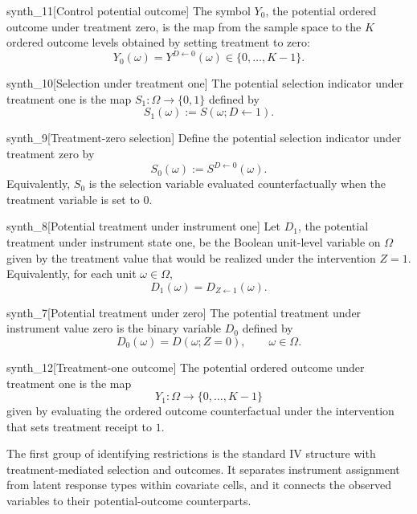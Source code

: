 \documentclass[11pt]{article}
\begin{document}
\begin{definitionv}{synth_11}[Control potential outcome]
The symbol \(Y_0\), the potential ordered outcome under treatment zero, is the map from the sample space to the \(K\) ordered outcome levels obtained by setting treatment to zero:
\[
Y_0(\omega)=Y^{D\leftarrow 0}(\omega)\in\{0,\ldots,K-1\}.
\]
\end{definitionv}

\begin{definitionv}{synth_10}[Selection under treatment one]
The potential selection indicator under treatment one is the map \(S_1:\Omega\to\{0,1\}\) defined by
\[
S_1(\omega) := S(\omega; D\leftarrow 1).
\]
\end{definitionv}

\begin{definitionv}{synth_9}[Treatment-zero selection]
Define the potential selection indicator under treatment zero by
\[
S_0(\omega) := S^{D \leftarrow 0}(\omega).
\]
Equivalently, \(S_0\) is the selection variable evaluated counterfactually when the treatment variable is set to \(0\).
\end{definitionv}

\begin{definitionv}{synth_8}[Potential treatment under instrument one]
Let \(D_1\), the potential treatment under instrument state one, be the Boolean unit-level variable on \(\Omega\) given by the treatment value that would be realized under the intervention \(Z=1\). Equivalently, for each unit \(\omega\in\Omega\),
\[
D_1(\omega)=D_{Z\leftarrow 1}(\omega).
\]
\end{definitionv}

\begin{definitionv}{synth_7}[Potential treatment under zero]
The potential treatment under instrument value zero is the binary variable \(D_0\) defined by
\[
D_0(\omega)=D(\omega; Z=0),\qquad \omega\in\Omega.
\]
\end{definitionv}

\begin{definitionv}{synth_12}[Treatment-one outcome]
The potential ordered outcome under treatment one is the map
\[
Y_1:\Omega\to\{0,\ldots,K-1\}
\]
given by evaluating the ordered outcome counterfactual under the intervention that sets treatment receipt to \(1\).
\end{definitionv}

The first group of identifying restrictions is the standard IV structure with treatment-mediated selection and outcomes. It separates instrument assignment from latent response types within covariate cells, and it connects the observed variables to their potential-outcome counterparts.
\end{document}

